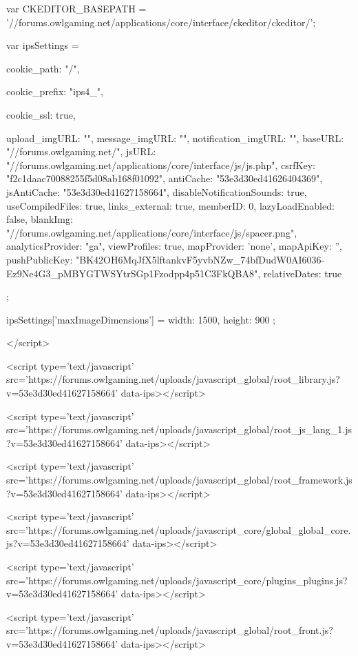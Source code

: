 		var CKEDITOR_BASEPATH = '//forums.owlgaming.net/applications/core/interface/ckeditor/ckeditor/';
	
		var ipsSettings = {
			
			
			cookie_path: "/",
			
			cookie_prefix: "ips4_",
			
			
			cookie_ssl: true,
			
			upload_imgURL: "",
			message_imgURL: "",
			notification_imgURL: "",
			baseURL: "//forums.owlgaming.net/",
			jsURL: "//forums.owlgaming.net/applications/core/interface/js/js.php",
			csrfKey: "f2c1daac70088255f5d08ab168f01092",
			antiCache: "53e3d30ed41626404369",
			jsAntiCache: "53e3d30ed41627158664",
			disableNotificationSounds: true,
			useCompiledFiles: true,
			links_external: true,
			memberID: 0,
			lazyLoadEnabled: false,
			blankImg: "//forums.owlgaming.net/applications/core/interface/js/spacer.png",
			analyticsProvider: "ga",
			viewProfiles: true,
			mapProvider: 'none',
			mapApiKey: '',
			pushPublicKey: "BK42OH6MqJfX5lftankvF5yvbNZw_74bfDudW0AI6036-Ez9Ne4G3_pMBYGTWSYtrSGp1Fzodpp4p51C3FkQBA8",
			relativeDates: true
		};
		
		
		
		
			ipsSettings['maxImageDimensions'] = {
				width: 1500,
				height: 900
			};
		
		
	</script>





<script type='text/javascript' src='https://forums.owlgaming.net/uploads/javascript_global/root_library.js?v=53e3d30ed41627158664' data-ips></script>


<script type='text/javascript' src='https://forums.owlgaming.net/uploads/javascript_global/root_js_lang_1.js?v=53e3d30ed41627158664' data-ips></script>


<script type='text/javascript' src='https://forums.owlgaming.net/uploads/javascript_global/root_framework.js?v=53e3d30ed41627158664' data-ips></script>


<script type='text/javascript' src='https://forums.owlgaming.net/uploads/javascript_core/global_global_core.js?v=53e3d30ed41627158664' data-ips></script>


<script type='text/javascript' src='https://forums.owlgaming.net/uploads/javascript_core/plugins_plugins.js?v=53e3d30ed41627158664' data-ips></script>


<script type='text/javascript' src='https://forums.owlgaming.net/uploads/javascript_global/root_front.js?v=53e3d30ed41627158664' data-ips></script>


